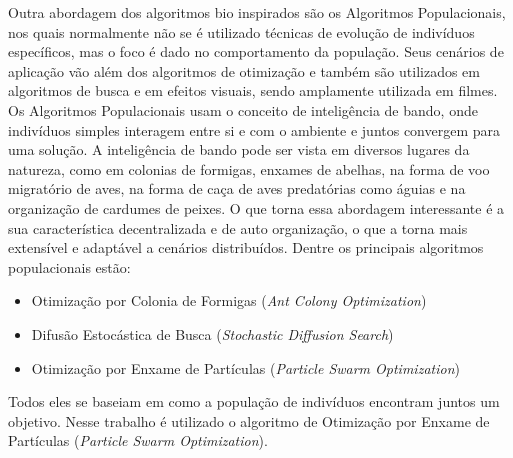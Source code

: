 \indent Outra abordagem dos algoritmos bio inspirados são os Algoritmos Populacionais, nos quais normalmente não se é utilizado técnicas de evolução de indivíduos específicos, mas o foco é dado no comportamento da população. 
%
Seus cenários de aplicação vão além dos algoritmos de otimização e também são utilizados em algoritmos de busca e em efeitos visuais, sendo amplamente utilizada em filmes. 
%
Os Algoritmos Populacionais usam o conceito de inteligência de bando, onde indivíduos simples interagem entre si e com o ambiente e juntos convergem para uma solução. 
%
A inteligência de bando pode ser vista em diversos lugares da natureza, como em colonias de formigas, enxames de abelhas, na forma de voo migratório de aves, na forma de caça de aves predatórias como águias e na organização de cardumes de peixes. 
%
O que torna essa abordagem interessante é a sua característica decentralizada e de auto organização, o que a torna mais extensível e adaptável a cenários distribuídos. 
%
\noindent Dentre os principais algoritmos populacionais estão:
\begin{itemize}
    \item Otimização por Colonia de Formigas (\textit{Ant Colony Optimization}) 
    \item Difusão Estocástica de Busca (\textit{Stochastic Diffusion Search})
    \item Otimização por Enxame de Partículas (\textit{Particle Swarm Optimization})
\end{itemize}

\noindent Todos eles se baseiam em como a população de indivíduos encontram juntos um objetivo. Nesse trabalho é utilizado o algoritmo de Otimização por Enxame de Partículas (\textit{Particle Swarm Optimization}). 
